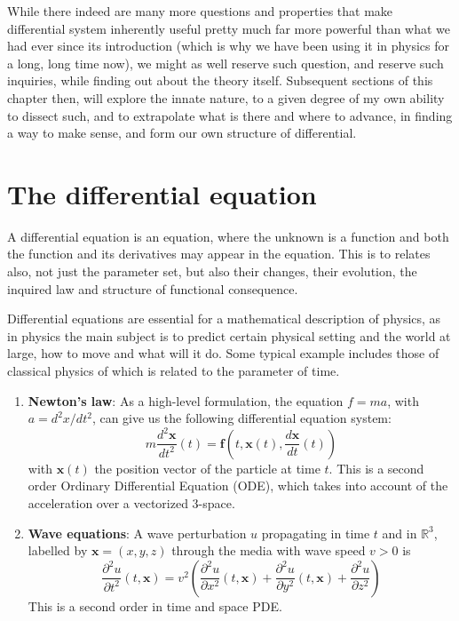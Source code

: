 While there indeed are many more questions and properties that make differential system inherently useful pretty much far more powerful than what we had ever since its introduction (which is why we have been using it in physics for a long, long time now), we might as well reserve such question, and reserve such inquiries, while finding out about the theory itself. Subsequent sections of this chapter then, will explore the innate nature, to a given degree of my own ability to dissect such, and to extrapolate what is there and where to advance, in finding a way to make sense, and form our own structure of differential. 

\section{The differential equation}

A differential equation is an equation, where the unknown is a function and both the function and its derivatives may appear in the equation. This is to relates also, not just the parameter set, but also their changes, their evolution, the inquired law and structure of functional consequence. 

Differential equations are essential for a mathematical description of physics, as in physics the main subject is to predict certain physical setting and the world at large, how to move and what will it do. Some typical example includes those of classical physics of which is related to the parameter of time. 
\begin{enumerate}
    \item \textbf{Newton's law}: As a high-level formulation, the equation $f=ma$, with $a=d^{2}x/dt^{2}$, can give us the following differential equation system:
    $$m \frac{d^{2}\mathbf{x}}{dt^{2}}(t)=\mathbf{f}\left( t,\mathbf{x}(t),\frac{d\mathbf{x}}{dt}(t) \right)$$
    with $\mathbf{x}(t)$ the position vector of the particle at time $t$. This is a second order Ordinary Differential Equation (ODE), which takes into account of the acceleration over a vectorized 3-space. 
    
    \item \textbf{Wave equations}: A wave perturbation $u$ propagating in time $t$ and in $\mathbb{R}^{3}$, labelled by $\textbf{x}=(x,y,z)$ through the media with wave speed $v>0$ is $$\frac{\partial^{2}u}{\partial t^{2}}(t,\mathbf{x})=v^{2}\left( \frac{\partial^{2}u}{\partial x^{2}} (t,\mathbf{x})+\frac{\partial^{2}u}{\partial y^{2}}(t,\mathbf{x})+\frac{\partial^{2}u}{\partial z^{2}}\right)$$ This is a second order in time and space PDE. 
\end{enumerate}

